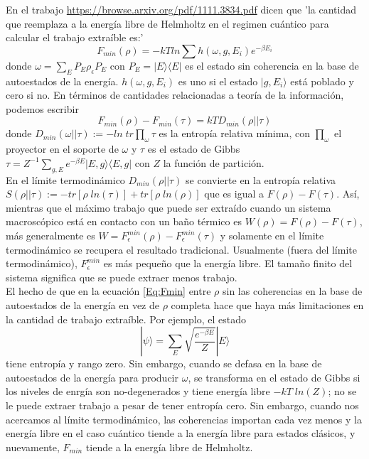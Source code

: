 \documentclass{article}
\def\be{\begin{equation}}
\def\te{\end{equation}}
\begin{document}
En el trabajo \url{https://browse.arxiv.org/pdf/1111.3834.pdf} dicen que 'la cantidad que reemplaza a la energía libre de Helmholtz en el regimen cuántico para calcular el trabajo extraíble es:'
\be
\label{Eq:Fmin}
F_{min}\left( \rho \right) = -kTln\sum h\left( \omega,g,E_i \right) e^{-\beta E_i}
\te
donde $\omega = \sum_E P_E \rho_{\epsilon} P_E$ con $P_E = |E\rangle\langle E|$ es el estado sin coherencia en la base de autoestados de la energía. $h\left( \omega,g,E_i \right)$ es uno si el estado $|g,E_i \rangle$ está poblado y cero si no. En términos de cantidades relacionadas a teoría de la información, podemos escribir
\be
F_{min}\left( \rho \right) - F_{min}\left( \tau \right) = kT D_{min}\left( \rho||\tau \right)
\te
donde $D_{min}\left( \omega || \tau \right) := -ln\; tr \prod_\omega \tau$ es la entropía relativa mínima, con $\prod_\omega$ el proyector en el soporte de $\omega$ y $\tau$ es el estado de Gibbs $\tau = Z^{-1} \sum_{g,E} e^{-\beta E}|E,g\rangle\langle E,g|$ con $Z$ la función de partición. \\
En el límite termodinámico $D_{min}\left( \rho || \tau \right)$ se convierte en la entropía relativa $S\left( \rho || \tau \right) := -tr\left[ \rho\; ln\left(\tau\right)\right] + tr\left[ \rho\; ln\left(\rho\right)\right]$ que es igual a $F\left( \rho \right) - F\left( \tau \right)$. Así, mientras que el máximo trabajo que puede ser extraído cuando un sistema macroscópico está en contacto con un baño térmico es $W\left( \rho \right) = F\left( \rho \right) - F\left( \tau \right)$, más generalmente es $W = F_{\epsilon}^{min}\left( \rho \right) - F_{\epsilon}^{min}\left( \tau \right)$ y solamente en el límite termodinámico se recupera el resultado tradicional. Usualmente (fuera del límite termodinámico), $F_{\epsilon}^{min}$ es más pequeño que la energía libre. El tamaño finito del sistema significa que se puede extraer menos trabajo. \\
El hecho de que en la ecuación \ref{Eq:Fmin} entre $\rho$ sin las coherencias en la base de autoestados de la energía en vez de $\rho$ completa hace que haya más limitaciones en la cantidad de trabajo extraíble. Por ejemplo, el estado
\be
|\psi\rangle = \sum_E \sqrt{\frac{e^{-\beta E}}{Z}} |E\rangle
\te
tiene entropía y rango zero. Sin embargo, cuando se defasa en la base de autoestados de la energía para producir $\omega$, se transforma en el estado de Gibbs si los niveles de enrgía son no-degenerados y tiene energía libre $-kT\; ln\left(Z\right)$; no se le puede extraer trabajo a pesar de tener entropía cero. Sin embargo, cuando nos acercamos al límite termodinámico, las coherencias importan cada vez menos y la energía libre en el caso cuántico tiende a la energía libre para estados clásicos, y nuevamente, $F_{min}$ tiende a la energía libre de Helmholtz.
\end{document}
